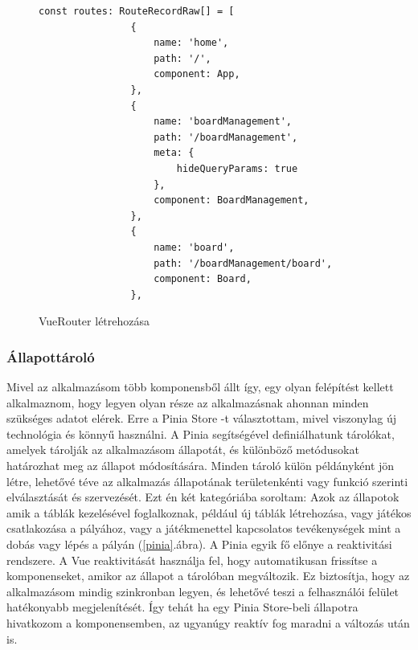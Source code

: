 \documentclass[a4paper,twoside]{article}
\begin{document}
\begin{figure}
	\caption{VueRouter létrehozása}
	\begin{adjustwidth}{0cm}{10cm}
		\begin{minipage}{\textwidth}
			\begin{lstlisting}[style=javascriptStyle]
				const routes: RouteRecordRaw[] = [
				{
					name: 'home',
					path: '/',
					component: App,
				},
				{
					name: 'boardManagement',
					path: '/boardManagement',
					meta: {
						hideQueryParams: true
					},
					component: BoardManagement,
				},
				{
					name: 'board',
					path: '/boardManagement/board',
					component: Board,
				},
			\end{lstlisting}
		\end{minipage}
	\end{adjustwidth}
	\label{vuerouter}
\end{figure}


\subsubsection{Állapottároló}
Mivel az alkalmazásom több komponensből állt így, egy olyan felépítést kellett alkalmaznom, hogy legyen olyan része 
az alkalmazásnak ahonnan minden szükséges adatot elérek. Erre a Pinia Store \cite{pinia}-t választottam, mivel viszonylag új technológia és könnyű használni. 
A Pinia segítségével definiálhatunk tárolókat, amelyek tárolják az alkalmazásom állapotát,
és különböző metódusokat határozhat meg az állapot módosítására. Minden tároló külön
példányként jön létre, lehetővé téve az alkalmazás állapotának területenkénti vagy funkció
szerinti elválasztását és \mbox{szervezését}. Ezt én két kategóriába soroltam: Azok az állapotok amik a táblák kezelésével foglalkoznak, például új táblák
létrehozása, vagy játékos csatlakozása a pályához, vagy a játékmenettel kapcsolatos tevékenységek mint a dobás vagy lépés a pályán (\ref{pinia}.ábra). 
A Pinia egyik fő előnye a reaktivitási rendszere. A Vue reaktivitását használja fel, hogy
automatikusan frissítse a komponenseket, amikor az állapot a tárolóban megváltozik. Ez
biztosítja, hogy az alkalmazásom mindig szinkronban legyen, és lehetővé teszi a
felhasználói felület hatékonyabb megjelenítését. Így tehát ha egy Pinia Store-beli állapotra hivatkozom a komponensemben, az ugyanúgy reaktív fog maradni a változás után is. 
\end{document}
